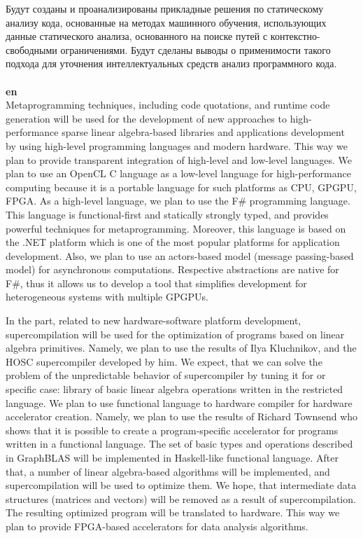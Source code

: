\documentclass[12pt]{article}  %
\theoremstyle{remark}
\begin{document}
Будут созданы и проанализированы прикладные решения по статическому анализу кода, основанные на методах машинного обучения, использующих данные статического анализа, основанного на поиске путей с контекстно-свободными ограничениями. Будут сделаны выводы о применимости такого подхода для уточнения интеллектуальных средств анализ программного кода.
\\
\\
\textbf{en}\\

Metaprogramming techniques, including code quotations, and runtime code generation will be used for the development of new approaches to high-performance sparse linear algebra-based libraries and applications development by using high-level programming languages and modern hardware. This way we plan to provide transparent integration of high-level and low-level languages. We plan to use an OpenCL C language as a low-level language for high-performance computing because it is a portable language for such platforms as CPU, GPGPU, FPGA. As a high-level language, we plan to use the F# programming language. This language is functional-first and statically strongly typed, and provides powerful techniques for metaprogramming. Moreover, this language is based on the .NET platform which is one of the most popular platforms for application development. Also, we plan to use an actors-based model (message passing-based model) for asynchronous computations. Respective abstractions are native for F#, thus it allows us to develop a tool that simplifies development for heterogeneous systems with multiple GPGPUs.

In the part, related to new hardware-software platform development, supercompilation will be used for the optimization of programs based on linear algebra primitives.  Namely, we plan to use the results of Ilya Kluchnikov, and the HOSC supercompiler developed by him. We expect, that we can solve the problem of the unpredictable behavior of supercompiler by tuning it for or specific case: library of basic linear algebra operations written in the restricted language. We plan to use functional language to hardware compiler for hardware accelerator creation. Namely, we plan to use the results of Richard Townsend who shows that it is possible to create a program-specific accelerator for programs written in a functional language. The set of basic types and operations described in GraphBLAS will be implemented in Haskell-like functional language. After that, a number of linear algebra-based algorithms will be implemented, and supercompilation will be used to optimize them. We hope, that intermediate data structures (matrices and vectors) will be removed as a result of supercompilation. The resulting optimized program will be translated to hardware. This way we plan to provide FPGA-based accelerators for data analysis algorithms.
\end{document}
